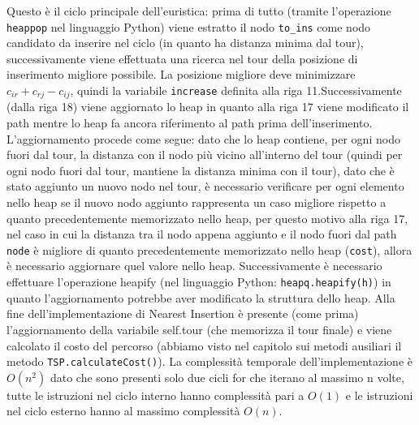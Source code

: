 \documentclass[a4paper,12pt]{report}
\begin{document}
Questo è il ciclo principale dell'euristica: prima di tutto (tramite l'operazione \lstinline!heappop! nel linguaggio Python) viene estratto il nodo \lstinline!to_ins! come nodo candidato da inserire nel ciclo (in quanto ha distanza minima dal tour), successivamente viene effettuata una ricerca nel tour della posizione di inserimento migliore possibile. La posizione migliore deve minimizzare $c_{ir} + c_{rj} - c_{ij}$, quindi la variabile \lstinline!increase! definita alla riga 11.\newline Successivamente (dalla riga 18) viene aggiornato lo heap in quanto alla riga 17 viene modificato il path mentre lo heap fa ancora riferimento al path prima dell'inserimento. L'aggiornamento procede come segue: dato che lo heap contiene, per ogni nodo fuori dal tour, la distanza con il nodo più vicino all'interno del tour (quindi per ogni nodo fuori dal tour, mantiene la distanza minima con il tour), dato che è stato aggiunto un nuovo nodo nel tour, è necessario verificare per ogni elemento nello heap se il nuovo nodo aggiunto rappresenta un caso migliore rispetto a quanto precedentemente memorizzato nello heap, per questo motivo alla riga 17, nel caso in cui la distanza tra il nodo appena aggiunto e il nodo fuori dal path \lstinline!node! è migliore di quanto precedentemente memorizzato nello heap (\lstinline!cost!), allora è necessario aggiornare quel valore nello heap. \newline Successivamente è necessario effettuare l'operazione heapify (nel linguaggio Python: \lstinline!heapq.heapify(h)!) in quanto l'aggiornamento potrebbe aver modificato la struttura dello heap. Alla fine dell'implementazione di Nearest Insertion è presente (come prima) l'aggiornamento della variabile self.tour (che memorizza il tour finale) e viene calcolato il costo del percorso (abbiamo visto nel capitolo sui metodi ausiliari il metodo \lstinline!TSP.calculateCost()!). \newline
La complessità temporale dell'implementazione è $O(n^2)$ dato che sono presenti solo due cicli for che iterano al massimo n volte, tutte le istruzioni nel ciclo interno hanno complessità pari a $O(1)$ e le istruzioni nel ciclo esterno hanno al massimo complessità $O(n)$.
\end{document}
